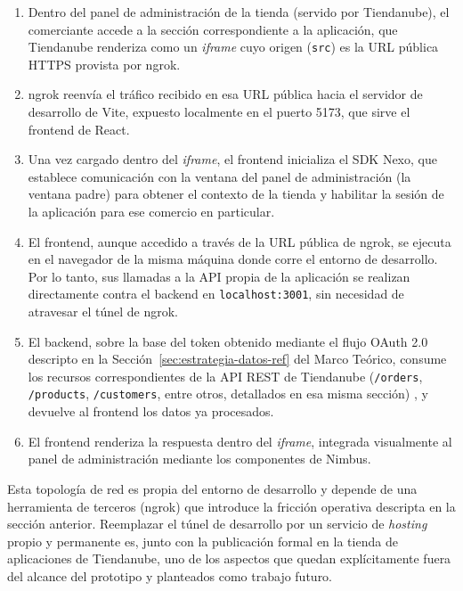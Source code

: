 \begin{enumerate}
    \item Dentro del panel de administración de la tienda (servido por Tiendanube), el comerciante accede a la sección correspondiente a la aplicación, que Tiendanube renderiza como un \emph{iframe} cuyo origen (\texttt{src}) es la URL pública HTTPS provista por ngrok.

    \item ngrok reenvía el tráfico recibido en esa URL pública hacia el servidor de desarrollo de Vite, expuesto localmente en el puerto 5173, que sirve el frontend de React.

    \item Una vez cargado dentro del \emph{iframe}, el frontend inicializa el SDK Nexo, que establece comunicación con la ventana del panel de administración (la ventana padre) para obtener el contexto de la tienda y habilitar la sesión de la aplicación para ese comercio en particular.

    \item El frontend, aunque accedido a través de la URL pública de ngrok, se ejecuta en el navegador de la misma máquina donde corre el entorno de desarrollo. Por lo tanto, sus llamadas a la API propia de la aplicación se realizan directamente contra el backend en \texttt{localhost:3001}, sin necesidad de atravesar el túnel de ngrok.

    \item El backend, sobre la base del token obtenido mediante el flujo OAuth 2.0 descripto en la Sección~\ref{sec:estrategia-datos-ref} del Marco Teórico, consume los recursos correspondientes de la API REST de Tiendanube (\texttt{/orders}, \texttt{/products}, \texttt{/customers}, entre otros, detallados en esa misma sección) \parencite{TiendanubeAPI2024}, y devuelve al frontend los datos ya procesados.

    \item El frontend renderiza la respuesta dentro del \emph{iframe}, integrada visualmente al panel de administración mediante los componentes de Nimbus.
\end{enumerate}

Esta topología de red es propia del entorno de desarrollo y depende de una herramienta de terceros (ngrok) que introduce la fricción operativa descripta en la sección anterior. Reemplazar el túnel de desarrollo por un servicio de \emph{hosting} propio y permanente es, junto con la publicación formal en la tienda de aplicaciones de Tiendanube, uno de los aspectos que quedan explícitamente fuera del alcance del prototipo y planteados como trabajo futuro.

